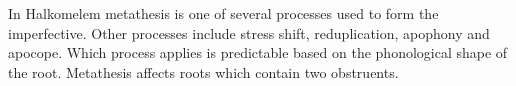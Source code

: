 In Halkomelem metathesis is one of several processes used to form the imperfective.
Other processes include stress shift, reduplication, apophony and apocope.
Which process applies is predictable based on the phonological shape of the root.
Metathesis affects roots which contain two obstruents.
%
